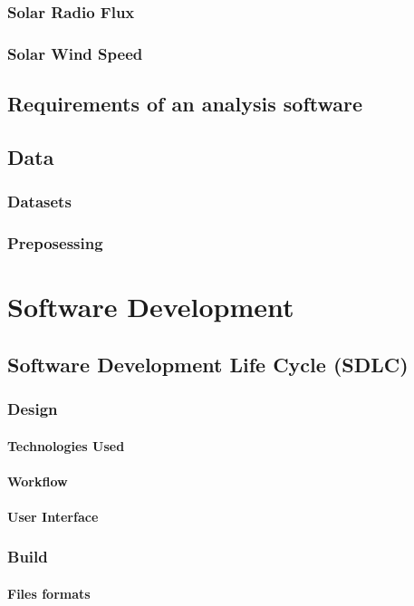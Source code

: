 \documentclass[a4paper, 12pt, nocenter]{thesis}
\begin{document}
			\subsection{Solar Radio Flux}
			\subsection{Solar Wind Speed}
		\section{Requirements of an analysis software}
		\section{Data}
			\subsection{Datasets}
			\subsection{Preposessing}
		
	\newpage
	\chapter{Software Development}
		\section{Software Development Life Cycle (SDLC)}
			\subsection{Design}
				\subsubsection{Technologies Used}
				\subsubsection{Workflow}
				\subsubsection{User Interface}
			\subsection{Build}
				\subsubsection{Files formats}
\end{document}
